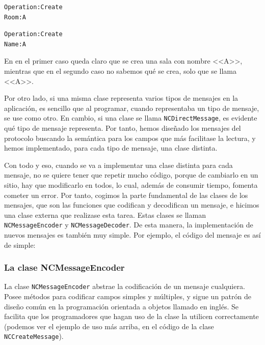 \begin{multicols}{2}
\begin{lstlisting}
Operation:Create
Room:A

\end{lstlisting}
     \columnbreak
\begin{lstlisting}
Operation:Create
Name:A

\end{lstlisting}
\end{multicols}

En en el primer caso queda claro que se crea una sala con nombre <<A>>, mientras que en el segundo caso no sabemos qué se crea, solo que se llama <<A>>.

Por otro lado, si una misma clase representa varios tipos de mensajes en la aplicación, es sencillo que al programar, cuando representaba un tipo de mensaje, se use como otro. En cambio, si una clase se llama \lstinline!NCDirectMessage!, es evidente qué tipo de mensaje representa. Por tanto, hemos diseñado los mensajes del protocolo buscando la semántica para los campos que más facilitase la lectura, y hemos implementado, para cada tipo de mensaje, una clase distinta.

Con todo y eso, cuando se va a implementar una clase distinta para cada mensaje, no se quiere tener que repetir mucho código, porque de cambiarlo en un sitio, hay que modificarlo en todos, lo cual, además de consumir tiempo, fomenta cometer un error. Por tanto, cogimos la parte fundamental de las clases de los mensajes, que son las funciones que codifican y decodifican un mensaje, e hicimos una clase externa que realizase esta tarea. Estas clases se llaman \lstinline!NCMessageEncoder! y \lstinline!NCMessageDecoder!. De esta manera, la implementación de nuevos mensajes es también muy simple. Por ejemplo, el código del mensaje  es así de simple:


\subsubsection*{La clase NCMessageEncoder}
La clase \lstinline{NCMessageEncoder} abstrae la codificación de un mensaje  cualquiera. Posee métodos para codificar campos simples y múltiples, y sigue un patrón de diseño común en la programación orientada a objetos llamado  en inglés. Se facilita que los programadores que hagan uso de la clase la utilicen correctamente (podemos ver el ejemplo de uso más arriba, en el código de la clase \lstinline!NCCreateMessage!).

